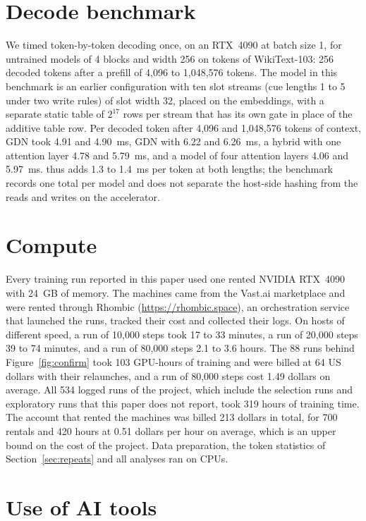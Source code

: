 \section{Decode benchmark}
\label{app:decode}

We timed token-by-token decoding once, on an RTX~4090 at batch size 1, for untrained models of 4
blocks and width 256 on tokens of WikiText-103: 256 decoded tokens after a prefill of 4,096 to
1,048,576 tokens. The \ingram{} model in this benchmark is an earlier configuration with ten slot
streams (cue lengths 1 to 5 under two write rules) of slot width 32, placed on the embeddings,
with a separate static table of $2^{17}$ rows per stream that has its own gate in place of the
additive table row. Per decoded token after 4,096 and 1,048,576
tokens of context, GDN took 4.91 and 4.90~ms, GDN with \ingram{} 6.22 and 6.26~ms, a hybrid with
one attention layer 4.78 and 5.79~ms, and a model of four attention layers 4.06 and 5.97~ms.
\ingram{} thus adds 1.3 to 1.4~ms per token at both lengths; the benchmark records one total per
model and does not separate the host-side hashing from the reads and writes on the accelerator.

\section{Compute}
\label{app:compute}

Every training run reported in this paper used one rented NVIDIA RTX~4090 with 24~GB of memory.
The machines came from the Vast.ai marketplace and were rented through Rhombic
(\url{https://rhombic.space}), an orchestration service that launched the runs, tracked their cost
and collected their logs. On hosts of different speed, a run of 10,000 steps took 17 to 33
minutes, a run of 20,000 steps 39 to 74 minutes, and a run of 80,000 steps 2.1 to 3.6 hours. The
88 runs behind Figure~\ref{fig:confirm} took 103 GPU-hours of training and were billed at 64 US
dollars with their relaunches, and a run of 80,000 steps cost 1.49 dollars on average. All 534
logged runs of the project, which include the selection runs and exploratory runs that this paper
does not report, took 319 hours of training time. The account that rented the machines was billed
213 dollars in total, for 700 rentals and 420 hours at 0.51 dollars per hour on average, which is
an upper bound on the cost of the project. Data preparation, the token statistics of Section~\ref{sec:repeats} and all analyses
ran on CPUs.

\section{Use of AI tools}
\label{app:ai}

